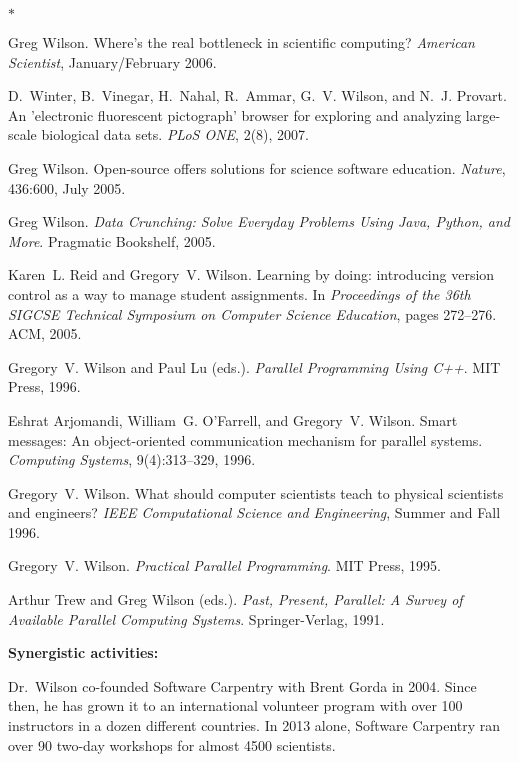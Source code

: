 \documentclass{proposalnsf}
\begin{document}
\begin{list}{$\ast$}{\setlength{\leftmargin}{1em}}
\item
Greg Wilson.
Where's the real bottleneck in scientific computing?
{\em American Scientist}, January/February 2006.

\item
D.~Winter, B.~Vinegar, H.~Nahal, R.~Ammar, G.~V. Wilson, and N.~J. Provart.
An 'electronic fluorescent pictograph' browser for exploring and analyzing large-scale biological data sets.
{\em PLoS ONE}, 2(8), 2007.

\item
Greg Wilson.
Open-source offers solutions for science software education.
{\em Nature}, 436:600, July 2005.

\item
Greg Wilson.
{\em Data Crunching: Solve Everyday Problems Using Java, Python, and More}.
Pragmatic Bookshelf, 2005.

\item
Karen~L. Reid and Gregory~V. Wilson.
Learning by doing: introducing version control as a way to manage student assignments.
In {\em Proceedings of the 36th SIGCSE Technical Symposium on Computer Science Education}, pages 272--276. ACM, 2005.

\item
Gregory~V. Wilson and Paul Lu (eds.).
{\em Parallel Programming Using C++}.
MIT Press, 1996.

\item
Eshrat Arjomandi, William~G. O'Farrell, and Gregory~V. Wilson.
Smart messages: An object-oriented communication mechanism for parallel systems.
{\em Computing Systems}, 9(4):313--329, 1996.

\item
Gregory~V. Wilson.
What should computer scientists teach to physical scientists and engineers?
{\em IEEE Computational Science and Engineering}, Summer and Fall 1996.

\item
Gregory~V. Wilson.
{\em Practical Parallel Programming}.
MIT Press, 1995.

\item
Arthur Trew and Greg Wilson (eds.).
{\em Past, Present, Parallel: A Survey of Available Parallel Computing Systems}.
Springer-Verlag, 1991.

\end{list}

\textbf{Synergistic activities:} %

Dr.\ Wilson co-founded Software Carpentry with Brent Gorda in 2004.
Since then,
he has grown it to an international volunteer program
with over 100 instructors in a dozen different countries.
In 2013 alone,
Software Carpentry ran over 90 two-day workshops for almost 4500 scientists.
\end{document}
